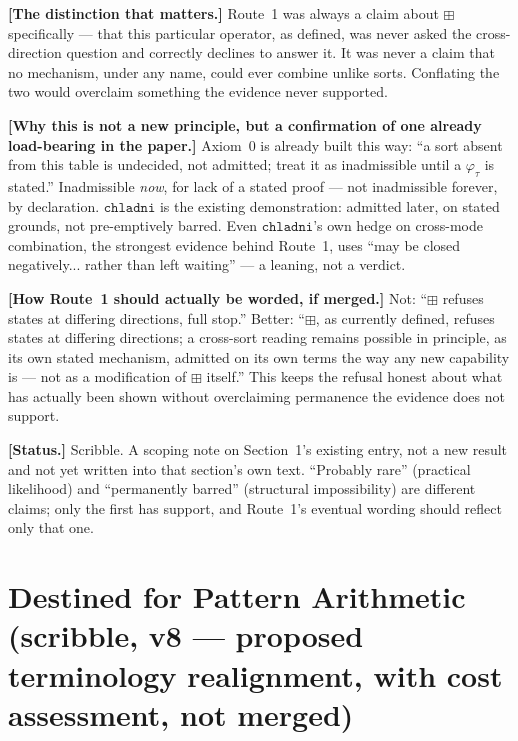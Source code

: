 \documentclass[11pt]{article}
\begin{document}
\textbf{[The distinction that matters.]} Route~1 was always a claim
about $\boxplus$ specifically --- that this particular operator, as
defined, was never asked the cross-direction question and correctly
declines to answer it. It was never a claim that no mechanism, under
any name, could ever combine unlike sorts. Conflating the two would
overclaim something the evidence never supported.

\textbf{[Why this is not a new principle, but a confirmation of one
already load-bearing in the paper.]} Axiom~0 is already built this
way: ``a sort absent from this table is undecided, not admitted;
treat it as inadmissible until a $\varphi_\tau$ is stated.''
Inadmissible \emph{now}, for lack of a stated proof --- not
inadmissible forever, by declaration. $\mathtt{chladni}$ is the
existing demonstration: admitted later, on stated grounds, not
pre-emptively barred. Even $\mathtt{chladni}$'s own hedge on
cross-mode combination, the strongest evidence behind Route~1, uses
``may be closed negatively... rather than left waiting'' --- a
leaning, not a verdict.

\textbf{[How Route~1 should actually be worded, if merged.]} Not:
``$\boxplus$ refuses states at differing directions, full stop.''
Better: ``$\boxplus$, as currently defined, refuses states at
differing directions; a cross-sort reading remains possible in
principle, as its own stated mechanism, admitted on its own terms the
way any new capability is --- not as a modification of $\boxplus$
itself.'' This keeps the refusal honest about what has actually been
shown without overclaiming permanence the evidence does not support.

\textbf{[Status.]} Scribble. A scoping note on Section~1's existing
entry, not a new result and not yet written into that section's own
text. ``Probably rare'' (practical likelihood) and ``permanently
barred'' (structural impossibility) are different claims; only the
first has support, and Route~1's eventual wording should reflect only
that one.

\section{Destined for Pattern Arithmetic (scribble, v8 --- proposed
terminology realignment, with cost assessment, not merged)}
\end{document}
